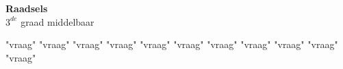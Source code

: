 \documentclass[12pt, a4paper]{article}
\begin{document}
	
	\begin{center}
		\Huge
		\textbf{Raadsels} \\
		\Large
		$3^{de}$ graad middelbaar
	\end{center}
	
	{"vraag"}
	{"vraag"}
	{"vraag"}
	{"vraag"}
	{"vraag"}
	{"vraag"}
	{"vraag"}
	{"vraag"}
	{"vraag"}
	{"vraag"}
	{"vraag"}
\end{document}
